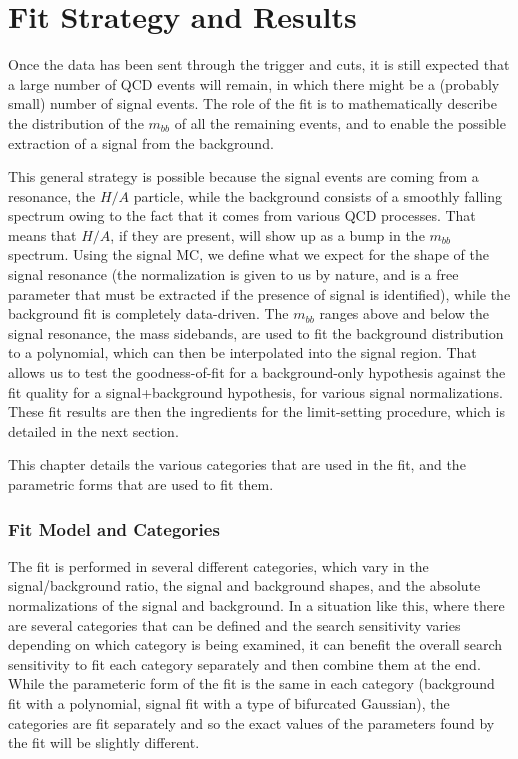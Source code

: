  

\chapter[Fit Strategy and Results]{Fit Strategy and Results}


Once the data has been sent through the trigger and cuts, it is still expected
that a large number of QCD events will remain, in which there might be a (probably small)
number of signal events.  The role of the fit is to mathematically describe
the distribution of the $m_{bb}$ of all the remaining events, and to enable the
possible extraction of a signal from the background.  

This general strategy is possible because the signal events are coming from a 
resonance, the $H/A$ particle, while the background consists of a smoothly 
falling spectrum owing to the fact that it comes from various QCD processes.
That means that $H/A$, if they are present, will show up as a bump in the $m_{bb}$
spectrum.  Using the signal MC, we define what we expect for the shape of
the signal resonance (the normalization is given to us by nature, and 
is a free parameter that must be extracted if the presence of signal is identified),
while the background fit is completely data-driven.  The $m_{bb}$ ranges above
and below the signal resonance, the mass sidebands, are used to 
fit the background distribution to a polynomial, which can then be interpolated
into the signal region.  That allows us to test the goodness-of-fit for a 
background-only hypothesis against the fit quality for a signal+background
hypothesis, for various signal normalizations.  These fit results are then
the ingredients for the limit-setting procedure, which is detailed in the next section.

This chapter details the various categories that are used in the fit, and
the parametric forms that are used to fit them.   

\subsection{Fit Model and Categories}
\label{subsec:fitmodel}
The fit is performed in several different categories, which vary in the 
signal/background ratio, the signal and background shapes, and the
absolute normalizations of the signal and background.  In a situation like
this, where there are several categories that can be defined and the
search sensitivity varies depending on which category is being examined,
it can benefit the overall search sensitivity to fit each category 
separately and then combine them at the end.  While the parameteric form
of the fit is the same in each category (background fit with a polynomial, 
signal fit with a type of bifurcated Gaussian), the categories are fit
separately and so the exact values of the parameters found by the fit
will be slightly different.  



